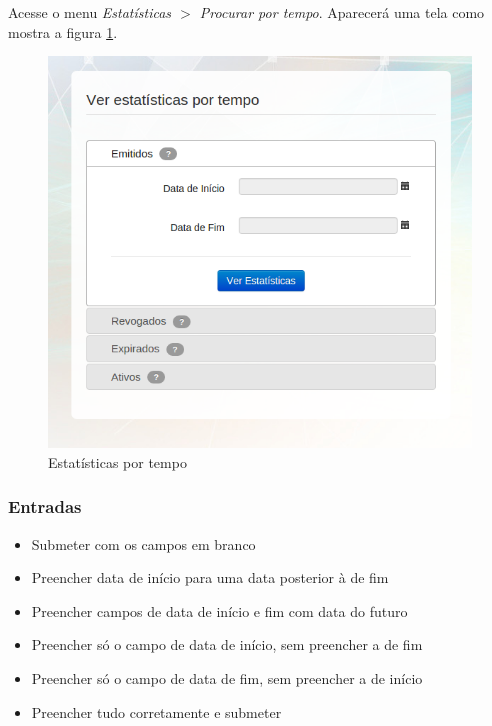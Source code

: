 Acesse o menu \textit{Estatísticas $>$ Procurar por tempo}. Aparecerá uma tela como mostra a figura \ref{fig:estempo}.

\begin{figure}[ht]
     \centering
     \includegraphics[scale=0.5]{images/saec-stats-2-3.png}
     \caption{Estatísticas por tempo}
     \label{fig:estempo}
\end{figure}

\subsubsection{Entradas}

\begin{itemize}

    \item Submeter com os campos em branco
	\item Preencher data de início para uma data posterior à de fim
	\item Preencher campos de data de início e fim com data do futuro
	\item Preencher só o campo de data de início, sem preencher a de fim
	\item Preencher só o campo de data de fim, sem preencher a de início
	\item Preencher tudo corretamente e submeter
	
\end{itemize}

